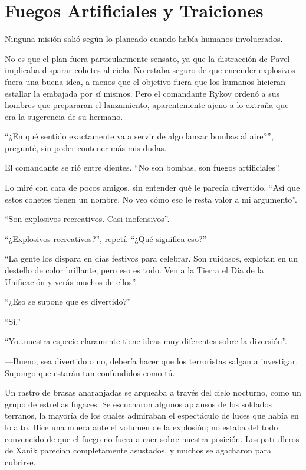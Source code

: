 \chapter{Fuegos Artificiales y Traiciones}\label{sec:fuegos-artificiales-y-traiciones}

Ninguna misión salió según lo planeado cuando había humanos involucrados.

No es que el plan fuera particularmente sensato, ya que la distracción de Pavel implicaba disparar cohetes al cielo. No estaba seguro de que encender explosivos fuera una buena idea, a menos que el objetivo fuera que los humanos hicieran estallar la embajada por sí mismos. Pero el comandante Rykov ordenó a sus hombres que prepararan el lanzamiento, aparentemente ajeno a lo extraña que era la sugerencia de su hermano.

``¿En qué sentido exactamente va a servir de algo lanzar bombas al aire?'', pregunté, sin poder contener más mis dudas.

El comandante se rió entre dientes. ``No son bombas, son fuegos artificiales''.

Lo miré con cara de pocos amigos, sin entender qué le parecía divertido. ``Así que estos cohetes tienen un nombre. No veo cómo eso le resta valor a mi argumento''.

``Son explosivos recreativos. Casi inofensivos''.

``¿Explosivos recreativos?'', repetí. ``¿Qué significa eso?''

``La gente los dispara en días festivos para celebrar. Son ruidosos, explotan en un destello de color brillante, pero eso es todo. Ven a la Tierra el Día de la Unificación y verás muchos de ellos''.

``¿Eso se supone que es divertido?''

``Sí.''

``Yo…nuestra especie claramente tiene ideas muy diferentes sobre la diversión''.

—Bueno, sea divertido o no, debería hacer que los terroristas salgan a investigar. Supongo que estarán tan confundidos como tú.

Un rastro de brasas anaranjadas se arqueaba a través del cielo nocturno, como un grupo de estrellas fugaces. Se escucharon algunos aplausos de los soldados terranos, la mayoría de los cuales admiraban el espectáculo de luces que había en lo alto. Hice una mueca ante el volumen de la explosión; no estaba del todo convencido de que el fuego no fuera a caer sobre nuestra posición. Los patrulleros de Xanik parecían completamente asustados, y muchos se agacharon para cubrirse.

